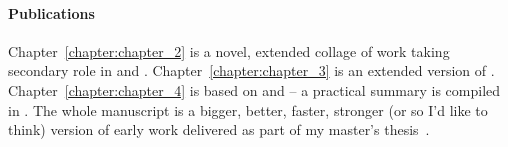 {\paragraph{Publications}
Chapter~\ref{chapter:chapter_2} is a novel, extended collage of work taking secondary role in \citet{kogkalidis-etal-2020-aethel} and \citet{rouss}.
Chapter~\ref{chapter:chapter_3} is an extended version of \citet{kogkalidis-etal-2020-aethel}.
Chapter~\ref{chapter:chapter_4} is based on \citet{kogkalidis-etal-2019-constructive,kogkalidis-etal-2020-neural} and \citet[preprint]{kogkalidis2022geometryaware} -- a practical summary is compiled in \citet[under review]{spindle}.
The whole manuscript is a bigger, better, faster, stronger (or so I'd like to think) version of early work delivered as part of my master's thesis~\cite{https://doi.org/10.48550/arxiv.1909.02955}.



\relax
}